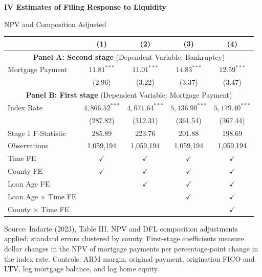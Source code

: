 \begin{minipage}{\textwidth}
\centering
\textbf{IV Estimates of Filing Response to Liquidity}
\par{\small NPV and Composition Adjusted}
\par\smallskip
{\scriptsize
\setlength{\tabcolsep}{9pt}
\renewcommand{\arraystretch}{1.08}
\begin{tabular*}{\textwidth}{@{\extracolsep{\fill}}lcccc@{}}
\hline
\hline
 & (1) & (2) & (3) & (4) \\
\hline
\multicolumn{5}{c}{\rule{0pt}{2.6ex}\textbf{Panel A: Second stage} (Dependent Variable: Bankruptcy)} \\[0.08cm]
\hline
Mortgage Payment & $11.81^{***}$ & $11.01^{***}$ & $14.83^{***}$ & $12.59^{***}$ \\
 & (2.96) & (3.22) & (3.37) & (3.47) \\[0.1cm]
\hline
\multicolumn{5}{c}{\rule{0pt}{2.6ex}\textbf{Panel B: First stage} (Dependent Variable: Mortgage Payment)} \\[0.08cm]
\hline
Index Rate & $4{,}866.52^{***}$ & $4{,}671.64^{***}$ & $5{,}136.90^{***}$ & $5{,}179.40^{***}$ \\
 & (287.82) & (312.31) & (361.54) & (367.44) \\
\hline
Stage 1 F-Statistic & 285.89 & 223.76 & 201.88 & 198.69 \\
Observations & 1,059,194 & 1,059,194 & 1,059,194 & 1,059,194 \\
\hline
Time FE & $\checkmark$ & $\checkmark$ & $\checkmark$ & $\checkmark$ \\
County FE & $\checkmark$ & $\checkmark$ & $\checkmark$ & $\checkmark$ \\
Loan Age FE & & $\checkmark$ & $\checkmark$ & $\checkmark$ \\
Loan Age $\times$ Time FE & & & $\checkmark$ & $\checkmark$ \\
County $\times$ Time FE & & & & $\checkmark$ \\
\hline
\hline
\end{tabular*}
}
\par\smallskip
{\tiny\raggedright
Source: Indarte (2023), Table III. NPV and DFL composition adjustments applied; standard errors clustered by county. First-stage coefficients measure dollar changes in the NPV of mortgage payments per percentage-point change in the index rate.
Controls: ARM margin, original payment, origination FICO and LTV, log mortgage balance, and log home equity.
\par}
\end{minipage}
